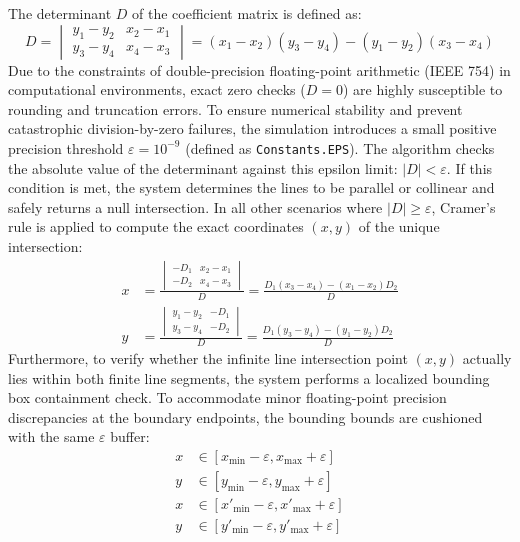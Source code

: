 \documentclass[../report_main.tex]{subfiles}
\begin{document}
The determinant $D$ of the coefficient matrix is defined as:
\begin{equation}
    D =
    \begin{vmatrix}
        y_1 - y_2 & x_2 - x_1 \\
        y_3 - y_4 & x_4 - x_3
    \end{vmatrix}
    =
    (x_1 - x_2)(y_3 - y_4) - (y_1 - y_2)(x_3 - x_4)
\end{equation}
Due to the constraints of double-precision floating-point arithmetic (IEEE 754) in computational environments, exact zero checks (${D = 0}$) are highly susceptible to rounding and truncation errors. To ensure numerical stability and prevent catastrophic division-by-zero failures, the simulation introduces a small positive precision threshold ${\varepsilon = 10^{-9}}$ (defined as \texttt{Constants.EPS}). The algorithm checks the absolute value of the determinant against this epsilon limit: ${|D| < \varepsilon}$. If this condition is met, the system determines the lines to be parallel or collinear and safely returns a null intersection. In all other scenarios where ${|D| \ge \varepsilon}$, Cramer's rule is applied to compute the exact coordinates $(x,y)$ of the unique intersection:
\begin{align}
    x &= \frac{
    \begin{vmatrix}
        -D_1 & x_2 - x_1 \\
        -D_2 & x_4 - x_3
    \end{vmatrix}
    }{D}
    =
    \frac{D_1(x_3 - x_4) - (x_1 - x_2)D_2}{D} \\
    y &= \frac{
    \begin{vmatrix}
        y_1 - y_2 & -D_1 \\
        y_3 - y_4 & -D_2
    \end{vmatrix}
    }{D}
    =
    \frac{D_1(y_3 - y_4) - (y_1 - y_2)D_2}{D}
\end{align}
Furthermore, to verify whether the infinite line intersection point $(x,y)$ actually lies within both finite line segments, the system performs a localized bounding box containment check. To accommodate minor floating-point precision discrepancies at the boundary endpoints, the bounding bounds are cushioned with the same $\varepsilon$ buffer:
\begin{align}
    x &\in [x_{\min} - \varepsilon, x_{\max} + \varepsilon] \\
    y &\in [y_{\min} - \varepsilon, y_{\max} + \varepsilon] \\
    x &\in [x'_{\min} - \varepsilon, x'_{\max} + \varepsilon] \\
    y &\in [y'_{\min} - \varepsilon, y'_{\max} + \varepsilon]
\end{align}
\end{document}
